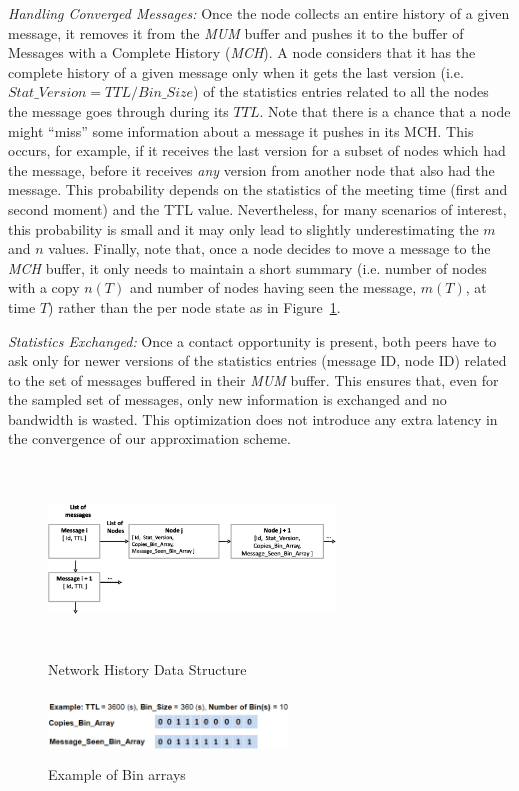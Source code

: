 \emph{Handling Converged Messages:} Once the node collects an entire history of a given message, it removes it from the \emph{MUM} buffer and pushes it to the buffer of Messages with a Complete History (\emph{MCH}). A node considers that it has the complete history of a given message only when it gets the last version (i.e. $Stat\_Version = TTL/Bin\_Size$) of the statistics entries related to all the nodes the message goes through during its $TTL$. Note that there is a chance that a node might ``miss'' some information about a message it pushes in its MCH. This occurs, for example, if it receives the last version for a subset of nodes which had the message, before it receives \emph{any} version from another node that also had the message. This probability depends on the statistics of the meeting time (first and second moment) and the TTL value. Nevertheless, for many scenarios of interest, this probability is small and it may only lead to slightly underestimating the $m$ and $n$ values. Finally, note that, once a node decides to move a message to the \emph{MCH} buffer, it only needs to maintain a short summary (i.e. number of nodes with a copy $n(T)$ and number of nodes having seen the message, $m(T)$, at time $T$) rather than the per node state as in  Figure~\ref{NHM}.

\emph{Statistics Exchanged:} Once a contact opportunity is present, both peers have to ask only for newer versions of the statistics entries (message ID, node ID) related to the set of messages buffered in their \emph{MUM} buffer. This ensures that, even for the sampled set of messages, only new information is exchanged and no bandwidth is wasted. This optimization does not introduce any extra latency in the convergence of our approximation scheme.


\begin{figure}[!h]
\centering
\includegraphics[width=3in,height=2in]{Chapitre3/Stat_Matrix.eps}
\caption{Network History Data Structure}
\label{NHM}
\end{figure}
\begin{figure}
\centering
\includegraphics[width=2.5in,height=0.7in]{Chapitre3/Bin_Array.eps}
\caption{Example of Bin arrays}
\label{BA}
\end{figure}


